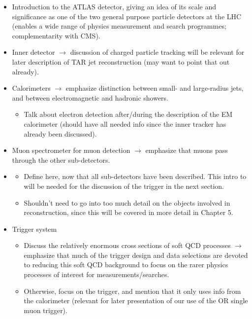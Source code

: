 \begin{itemize}
\item Introduction to the ATLAS detector, giving an idea of its scale and significance as one of the two general purpose particle detectors at the LHC (enables a wide range of physics measurement and search programmes; complementarity with CMS).
\item Inner detector $\rightarrow$ discussion of charged particle tracking will be relevant for later description of TAR jet reconstruction (may want to point that out already).
\item Calorimeters $\rightarrow$ emphasize distinction between small- and large-radius jets, and between electromagnetic and hadronic showers. 
\begin{itemize}
\item Talk about electron detection after/during the description of the EM calorimeter (should have all needed info since the inner tracker has already been discussed). 
\end{itemize}
\item Muon spectrometer for muon detection $\rightarrow$ emphasize that muons pass through the other sub-detectors. 
\item \met 
\begin{itemize}
\item Define \met here, now that all sub-detectors have been described. This intro to \met will be needed for the discussion of the \met trigger in the next section.
\item Shouldn't need to go into too much detail on the objects involved in \met reconstruction, since this will be covered in more detail in Chapter 5.
\end{itemize}
\item Trigger system 
\begin{itemize}
\item Discuss the relatively enormous cross sections of soft QCD processes $\rightarrow$ emphasize that much of the trigger design and data selections are devoted to reducing this soft QCD background to focus on the rarer physics processes of interest for measurements/searches. 
\item Otherwise, focus on the \met trigger, and mention that it only uses info from the calorimeter (relevant for later presentation of our use of the \met OR single muon trigger).
\end{itemize}
\end{itemize}
